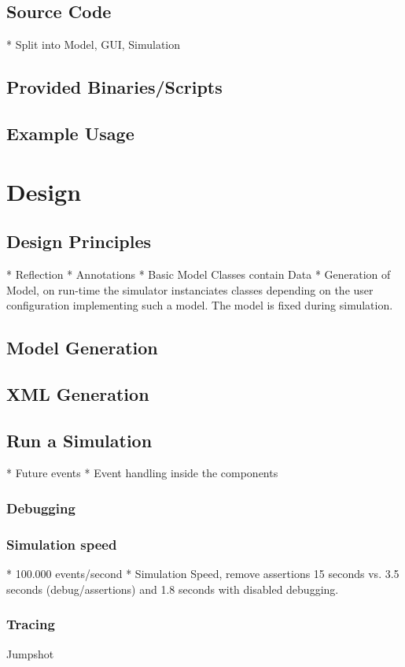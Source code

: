 \documentclass[
     11pt,         %
     a4paper,      %
     BCOR10mm,     %
     DIV14,        %
     liststotoc,   %
     bibtotoc,     %
     idxtotoc,     %
     parskip       %
     ]{scrreprt}   %
\begin{document}
\section{Source Code}
* Split into Model, GUI, Simulation
\section{Provided Binaries/Scripts}
\section{Example Usage}


\chapter{Design}

\section{Design Principles}
* Reflection
* Annotations
* Basic Model Classes contain Data
* Generation of Model, on run-time the simulator instanciates classes depending on the user configuration implementing such a model. The model is fixed during simulation.

\section{Model Generation}

\section{XML Generation}

\section{Run a Simulation}
* Future events
* Event handling inside the components

\subsection{Debugging}

\subsection{Simulation speed}
* 100.000 events/second
* Simulation Speed, remove assertions 15 seconds vs. 3.5 seconds (debug/assertions) and 1.8 seconds with disabled debugging.

\subsection{Tracing}
Jumpshot


\appendix

\listoffigures
\listoftables



\end{document}
